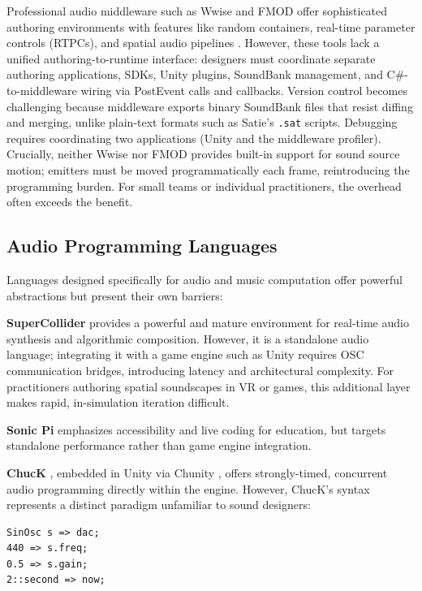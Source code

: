 \documentclass[sigconf,anonymous,review]{nimeart}
\begin{document}
Professional audio middleware such as Wwise and FMOD offer sophisticated authoring environments with features like random containers, real-time parameter controls (RTPCs), and spatial audio pipelines \cite{gameaudiomiddleware}. However, these tools lack a unified authoring-to-runtime interface: designers must coordinate separate authoring applications, SDKs, Unity plugins, SoundBank management, and C\#-to-middleware wiring via PostEvent calls and callbacks. Version control becomes challenging because middleware exports binary SoundBank files that resist diffing and merging, unlike plain-text formats such as Satie's \texttt{.sat} scripts. Debugging requires coordinating two applications (Unity and the middleware profiler). Crucially, neither Wwise nor FMOD provides built-in support for sound source motion; emitters must be moved programmatically each frame, reintroducing the programming burden. For small teams or individual practitioners, the overhead often exceeds the benefit.

\subsection{Audio Programming Languages}

Languages designed specifically for audio and music computation offer powerful abstractions but present their own barriers:

\textbf{SuperCollider} \cite{mccartney2002supercollider} provides a powerful and mature environment for real-time audio synthesis and algorithmic composition. However, it is a standalone audio language; integrating it with a game engine such as Unity requires OSC communication bridges, introducing latency and architectural complexity. For practitioners authoring spatial soundscapes in VR or games, this additional layer makes rapid, in-simulation iteration difficult.

\textbf{Sonic Pi} \cite{aaron2016sonic} emphasizes accessibility and live coding for education, but targets standalone performance rather than game engine integration.

\textbf{ChucK} \cite{wang2003chuck}, embedded in Unity via Chunity \cite{atherton2018chunity}, offers strongly-timed, concurrent audio programming directly within the engine. However, ChucK's syntax represents a distinct paradigm unfamiliar to sound designers:

\begin{lstlisting}
SinOsc s => dac;
440 => s.freq;
0.5 => s.gain;
2::second => now;
\end{lstlisting}
\end{document}
